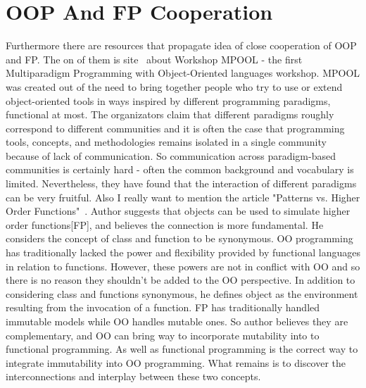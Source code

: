 \section{OOP And FP Cooperation}
Furthermore there are resources that propagate idea of close cooperation of OOP and FP.
The on of them is site~\cite{res8} about Workshop MPOOL - the first Multiparadigm Programming with Object-Oriented languages workshop. MPOOL was created out of the need to bring together people who try to use or extend object-oriented tools in ways inspired by different programming paradigms, functional at most. The organizators claim that different paradigms roughly correspond to different communities and it is often the case that programming tools, concepts, and methodologies remains isolated in a single community because of lack of communication. So communication across paradigm-based communities is certainly hard - often the common background and vocabulary is limited. Nevertheless, they have found that the interaction of different paradigms can be very fruitful.
Also I really want to mention the article "Patterns vs. Higher Order Functions"~\cite{res18}.
Author suggests that objects can be used to simulate higher order functions[FP], and believes the connection is more fundamental. He considers the concept of class and function to be synonymous. OO programming has traditionally lacked the power and flexibility provided by functional languages in relation to functions. However, these powers are not in conflict with OO and so there is no reason they shouldn't be added to the OO perspective.
In addition to considering class and functions synonymous, he defines object as the environment resulting from the invocation of a function.
FP has traditionally handled immutable models while OO handles mutable ones. So author believes they are complementary, and OO can bring way to incorporate mutability into to functional programming. As well as functional programming is the correct way to integrate immutability into OO programming. What remains is to discover the interconnections and interplay between these two concepts.

